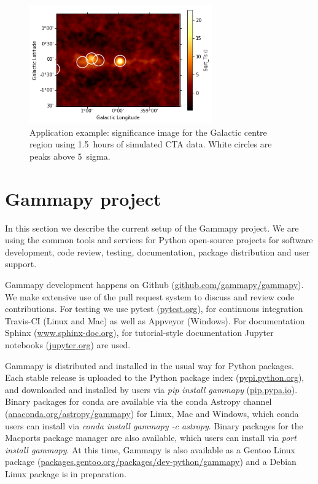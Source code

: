\documentclass{PoS}
\newcommand{\urlGammapyGithub}{\href{https://github.com/gammapy/gammapy}{github.com/gammapy/gammapy}}
\newcommand{\urlPytest}{\href{https://pytest.org}{pytest.org}}
\newcommand{\urlSphinx}{\href{http://www.sphinx-doc.org}{www.sphinx-doc.org}}
\newcommand{\urlJupyter}{\href{https://jupyter.org}{jupyter.org}}
\newcommand{\urlPypi}{\href{https://pypi.python.org}{pypi.python.org}}
\newcommand{\urlPip}{\href{https://pip.pypa.io}{pip.pypa.io}}
\newcommand{\urlAnacondaGammapy}{\href{https://anaconda.org/astropy/gammapy}{anaconda.org/astropy/gammapy}}
\newcommand{\urlGentooGammapy}{\href{https://packages.gentoo.org/packages/dev-python/gammapy}{packages.gentoo.org/packages/dev-python/gammapy}}
\begin{document}
\begin{figure}[t]
\centering
\includegraphics[width=0.7\textwidth]{figures/gammapy_example_sky_image.png}
\caption{
Application example: significance image for the Galactic centre region using
1.5~hours of simulated CTA data.  White circles are peaks above 5~sigma.
}
\label{fig:app}
\end{figure}

\section{Gammapy project}
\label{sec:project}

In this section we describe the current setup of the Gammapy project. We are using the common tools and services for Python open-source projects for software
development, code review, testing, documentation, package distribution and user
support.

Gammapy development happens on Github (\urlGammapyGithub). We make extensive use
of the pull request system to discuss and review code contributions. For testing
we use pytest (\urlPytest), for continuous integration Travis-CI (Linux and Mac)
as well as Appveyor (Windows). For documentation Sphinx (\urlSphinx), for
tutorial-style documentation Jupyter notebooks (\urlJupyter) are used.

Gammapy is distributed and installed in the usual way for Python packages. Each
stable release is uploaded to the Python package index (\urlPypi), and
downloaded and installed by users via {\it pip install gammapy} (\urlPip).
Binary packages for conda are available via the conda Astropy channel
(\urlAnacondaGammapy) for Linux, Mac and Windows, which conda users can install
via {\it conda install gammapy -c astropy}. Binary packages for the Macports
package manager are also available, which users can install via {\it port
install gammapy}. At this time, Gammapy is also available as a Gentoo Linux
package (\urlGentooGammapy) and a Debian Linux package is in preparation.
\end{document}
